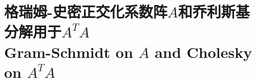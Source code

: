 \section[格瑞姆-史密正交化系数阵$A$和乔利斯基分解用于$A^{T}A$]{格瑞姆-史密正交化系数阵$A$和乔利斯基分解用于$A^{T}A$\\Gram-Schmidt on $A$ and Cholesky on $A^{T}A$}
